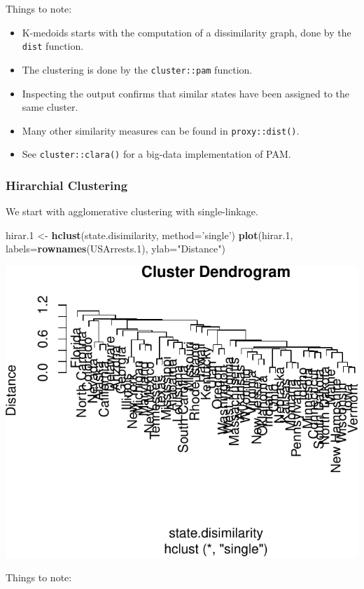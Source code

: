 \documentclass[]{book}
\newenvironment{Shaded}{\begin{snugshade}}{\end{snugshade}}
\newcommand{\DataTypeTok}[1]{\textcolor[rgb]{0.13,0.29,0.53}{#1}}
\newcommand{\FloatTok}[1]{\textcolor[rgb]{0.00,0.00,0.81}{#1}}
\newcommand{\KeywordTok}[1]{\textcolor[rgb]{0.13,0.29,0.53}{\textbf{#1}}}
\newcommand{\NormalTok}[1]{#1}
\newcommand{\StringTok}[1]{\textcolor[rgb]{0.31,0.60,0.02}{#1}}
\providecommand{\tightlist}{%
  \setlength{\itemsep}{0pt}\setlength{\parskip}{0pt}}
\theoremstyle{definition}
\theoremstyle{definition}
\theoremstyle{definition}
\theoremstyle{remark}
\begin{document}
Things to note:

\begin{itemize}
\tightlist
\item
  K-medoids starts with the computation of a dissimilarity graph, done by the \texttt{dist} function.
\item
  The clustering is done by the \texttt{cluster::pam} function.
\item
  Inspecting the output confirms that similar states have been assigned to the same cluster.
\item
  Many other similarity measures can be found in \texttt{proxy::dist()}.
\item
  See \texttt{cluster::clara()} for a big-data implementation of PAM.
\end{itemize}

\hypertarget{hirarchial-clustering-1}{%
\subsubsection{Hirarchial Clustering}\label{hirarchial-clustering-1}}

We start with agglomerative clustering with single-linkage.

\begin{Shaded}
\begin{Highlighting}[]
\NormalTok{hirar}\FloatTok{.1}\NormalTok{ <-}\StringTok{ }\KeywordTok{hclust}\NormalTok{(state.disimilarity, }\DataTypeTok{method=}\StringTok{'single'}\NormalTok{)}
\KeywordTok{plot}\NormalTok{(hirar}\FloatTok{.1}\NormalTok{, }\DataTypeTok{labels=}\KeywordTok{rownames}\NormalTok{(USArrests}\FloatTok{.1}\NormalTok{), }\DataTypeTok{ylab=}\StringTok{"Distance"}\NormalTok{)}
\end{Highlighting}
\end{Shaded}

\includegraphics[width=0.5\linewidth]{Rcourse_files/figure-latex/HirarchialClustering-1}

Things to note:
\end{document}
